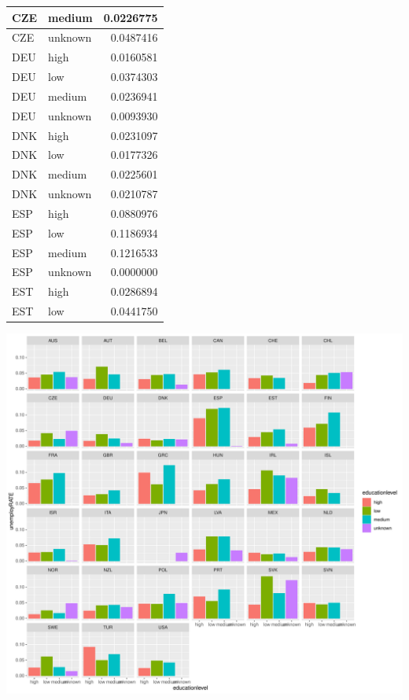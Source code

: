 \documentclass[11pt,a4paper,]{article}
\let\origfigure\figure
\let\endorigfigure\endfigure
\renewenvironment{figure}[1][2] {
    \expandafter\origfigure\expandafter[H]
} {
    \endorigfigure
}%
\begin{document}
\begin{table}[H]
\begin{tabular}[t]{l|l|r}
\hline
\rowcolor{gray!6}  CZE & medium & 0.0226775\\
\hline
CZE & unknown & 0.0487416\\
\hline
\rowcolor{gray!6}  DEU & high & 0.0160581\\
\hline
DEU & low & 0.0374303\\
\hline
\rowcolor{gray!6}  DEU & medium & 0.0236941\\
\hline
DEU & unknown & 0.0093930\\
\hline
\rowcolor{gray!6}  DNK & high & 0.0231097\\
\hline
DNK & low & 0.0177326\\
\hline
\rowcolor{gray!6}  DNK & medium & 0.0225601\\
\hline
DNK & unknown & 0.0210787\\
\hline
\rowcolor{gray!6}  ESP & high & 0.0880976\\
\hline
ESP & low & 0.1186934\\
\hline
\rowcolor{gray!6}  ESP & medium & 0.1216533\\
\hline
ESP & unknown & 0.0000000\\
\hline
\rowcolor{gray!6}  EST & high & 0.0286894\\
\hline
EST & low & 0.0441750\\
\hline
\end{tabular}
\end{table}

\pagebreak

\begin{figure}
\centering
\includegraphics{ETC5513assignment4_files/figure-latex/ed_un-1.pdf}
\caption{(\#fig:ed\_un)unemployment rate among different education level}
\end{figure}
\end{document}
